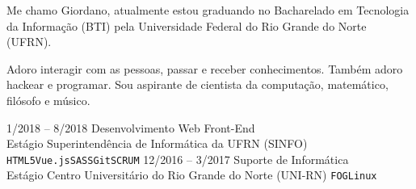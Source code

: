 \documentclass[9pt]{developercv} %
\begin{document}
\vspace{0.5cm}



\begin{minipage}[t]{0.4\textwidth} %
    \vspace{-\baselineskip} %
    
    Me chamo Giordano, atualmente estou graduando no Bacharelado em Tecnologia da Informação (BTI) pela Universidade Federal do Rio Grande do Norte (UFRN).
    
    Adoro interagir com as pessoas, passar e receber conhecimentos. Também adoro hackear e programar. Sou aspirante de cientista da computação, matemático, filósofo e músico.\\
\end{minipage}
\hfill %
\begin{minipage}[t]{0.5\textwidth} %
    \vspace{-\baselineskip} %
    \begin{barchart}{5.5}
    \end{barchart}
\end{minipage}




\begin{entrylist}
    \entry
        {1/2018 -- 8/2018}
        {Desenvolvimento Web Front-End\\
        \footnotesize{Estágio}}
        {Superintendência de Informática da UFRN (SINFO)}
        {\texttt{HTML5}\slashsep\texttt{Vue.js}\slashsep\texttt{SASS}\slashsep\texttt{Git}\slashsep\texttt{SCRUM}}
    \entry
        {12/2016 -- 3/2017}
        {Suporte de Informática\\
        \footnotesize{Estágio}}
        {Centro Universitário do Rio Grande do Norte (UNI-RN)}
        {\texttt{FOG}\slashsep\texttt{Linux}}
\end{entrylist}
\end{document}
